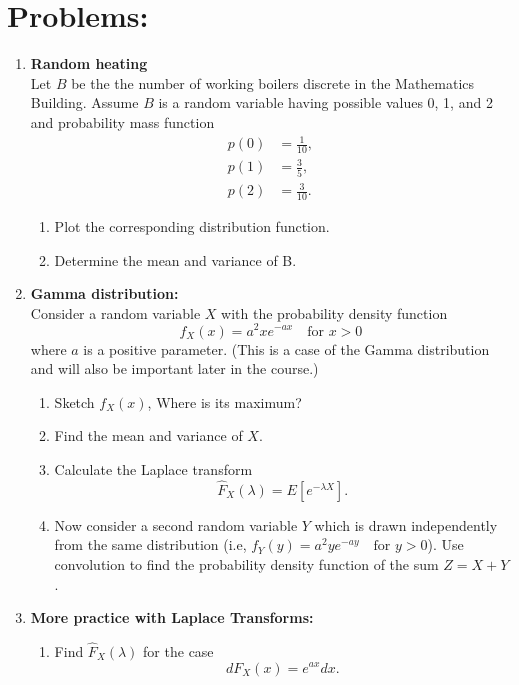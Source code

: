 \documentclass[11pt,a4paper]{article}
\begin{document}
  \section*{Problems:}
  \begin{enumerate}
    \item \textbf{Random heating}\\
    Let $B$ be the the number of working boilers discrete in the Mathematics Building. Assume $B$ is a random variable having possible values 0, 1, and 2 and probability mass function
    \begin{align*}
      p(0) &= \frac{1}{10},\\
      p(1) &= \frac{3}{5},\\
      p(2) &= \frac{3}{10}.
    \end{align*}
    \begin{enumerate}
      \item Plot the corresponding distribution function.
      \item Determine the mean and variance of B.
    \end{enumerate}
    \item \textbf{Gamma distribution:}\\
    Consider a random variable $X$ with the probability density function
    $$
    f_X(x) = a^2xe^{-ax} \quad \text{for $x > 0$}
    $$
    where $a$ is a positive parameter. (This is a case of the Gamma distribution and will also be important later in the course.)
    \begin{enumerate}
      \item Sketch $f_X(x)$, Where is its maximum?
      \item Find the mean and variance of $X$.
      \item Calculate the Laplace transform
      $$
        \hat{F}_X(\lambda) = E[e^{-\lambda X}].
      $$
      \item Now consider a second random variable $Y$ which is drawn independently from the same distribution (i.e, $f_Y(y) = a^2ye^{-ay} \quad \text{for $y > 0$}$). Use convolution to find the probability density function of the sum $Z = X + Y$.
    \end{enumerate}
    \item \textbf{More practice with Laplace Transforms:}\\
    \begin{enumerate}
      \item Find $\hat{F}_X(\lambda)$ for the case $$dF_X(x) = e^{ax}dx.$$
    \end{enumerate}
  \end{enumerate}
\end{document}
